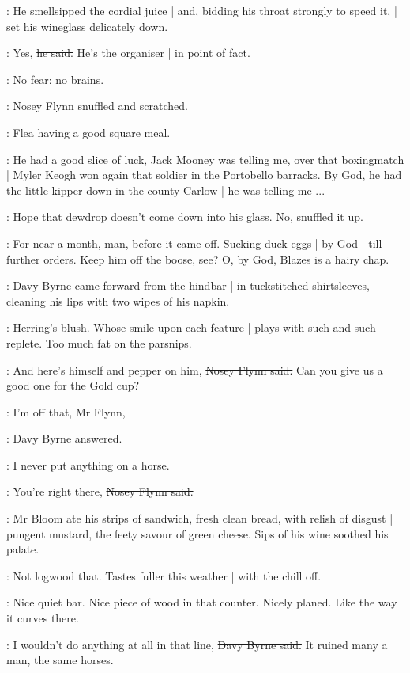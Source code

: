 :
He smellsipped the cordial juice |
and, bidding his throat strongly to speed it, |
set his wineglass delicately down.

\Bloom:
Yes,
\sout{he said.}
He's the organiser |
in point of fact.

\BloomInt:
No fear:
no brains.

:
Nosey Flynn snuffled and scratched.

\BloomInt:
Flea having a good square meal.

\nosey:
He had a good slice of luck,
Jack Mooney was telling me,
over that boxingmatch |
Myler Keogh won again that soldier in the Portobello barracks.
By God,
he had the little kipper down in the county Carlow |
he was telling me ...

\BloomInt:
Hope that dewdrop doesn't come down into his glass.
No,
snuffled it up.

\nosey:
For near a month, man,
before it came off.
Sucking duck eggs |
by God |
till further orders.
Keep him off the boose, see?
O, by God,
Blazes is a hairy chap.

:
Davy Byrne came forward from the hindbar |
in tuckstitched shirtsleeves,
cleaning his lips with two wipes of his napkin.

\BloomInt:
Herring's blush.
Whose smile upon each feature |
plays with such and such replete.
Too much fat on the parsnips.

\nosey:
And here's himself and pepper on him,
\sout{Nosey Flynn said.}
Can you give us a good one for the Gold cup?

\davybyrne:
I'm off that, Mr Flynn,

:
Davy Byrne answered.

\davybyrne:
I never put anything on a horse.

\nosey:
You're right there,
\sout{Nosey Flynn said.}

:
Mr Bloom ate his strips of sandwich,
fresh clean bread,
with relish of disgust |
pungent mustard,
the feety savour of green cheese.
Sips of his wine soothed his palate.

\BloomInt:
Not logwood that.
Tastes fuller this weather |
with the chill off.

\BloomInt:
Nice quiet bar.
Nice piece of wood in that counter.
Nicely planed.
Like the way it curves there.

\davybyrne:
I wouldn't do anything at all in that line,
\sout{Davy Byrne said.}
It ruined many a man,
the same horses.

